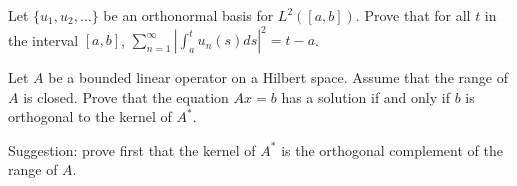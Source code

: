 \begin{alist}
\item Let $\{u_1,u_2,\ldots \}$ be an orthonormal basis for
$L^2([a,b])$. Prove that for all $t$ in the interval $[a,b]$,
$\sum_{n=1}^{\infty}|\int_a^tu_n(s)ds|^2=t-a$.
\item Let $A$ be a bounded linear operator on a Hilbert space. Assume that
the range of $A$ is closed. Prove that the equation $Ax=b$ has a
solution if and only if $b$ is orthogonal to the kernel of
$A^*$. 

Suggestion: prove first that the kernel of $A^*$ is the orthogonal
complement of the range of $A$.
\end{alist}
